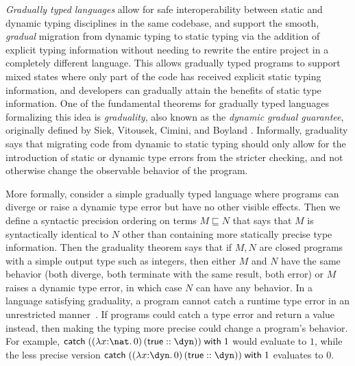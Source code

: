 \documentclass[acmsmall,screen,review,anonymous]{acmart}
\theoremstyle{remark}
\newif\ifdraft
\renewcommand{\max}[1]{\ifdraft{\color{blue}[{\bf Max says}: #1]}\fi}
\begin{document}
\emph{Gradually typed languages} \cite{siek-taha06, tobin-hochstadt06} allow for
safe interoperability between static and dynamic typing disciplines in the same
codebase, and support the smooth, \emph{gradual} migration from dynamic typing
to static typing via the addition of explicit typing information without needing
to rewrite the entire project in a completely different language.
%
This allows gradually typed programs to support mixed states where
only part of the code has received explicit static typing information,
and developers can gradually attain the benefits of static type
information.
%
One of the fundamental theorems for gradually typed languages
formalizing this idea is \emph{graduality}, also known as the
\emph{dynamic gradual guarantee}, originally defined by Siek,
Vitousek, Cimini, and Boyland \cite{siek_et_al:LIPIcs:2015:5031,
  new-ahmed2018}.
%
Informally, graduality says that migrating code from dynamic to static
typing should only allow for the introduction of static or dynamic
type errors from the stricter checking, and not otherwise change the
observable behavior of the program.

More formally, consider a simple gradually typed language where programs can
diverge or raise a dynamic type error but have no other visible effects. Then we
define a syntactic precision ordering on terms $M \sqsubseteq N$ that says that
$M$ is syntactically identical to $N$ other than containing more statically
precise type information. Then the graduality theorem says that if $M, N$ are
closed programs with a simple output type such as integers, then either $M$ and
$N$ have the same behavior (both diverge, both terminate with the same result,
both error) or $M$ raises a dynamic type error, in which case $N$ can have any
behavior. In a language satisfying graduality, a program cannot catch a runtime
type error in an unrestricted manner~\cite{new-ahmed2018}.
%
If programs could catch a type error and return a value instead, then making the
typing more precise could change a program's behavior. For example,
%
$\textsf{catch}\; ((\lambda x{:}\nat.\, 0)\, (\textsf{true} :: \dyn))\; \textsf{with}\; 1$ 
%
would evaluate to $1$, while the less precise version
%
$\textsf{catch}\; ((\lambda x{:}\dyn.\, 0)\, (\textsf{true} :: \dyn))\; \textsf{with}\; 1$
%
evaluates to $0$.
\end{document}
